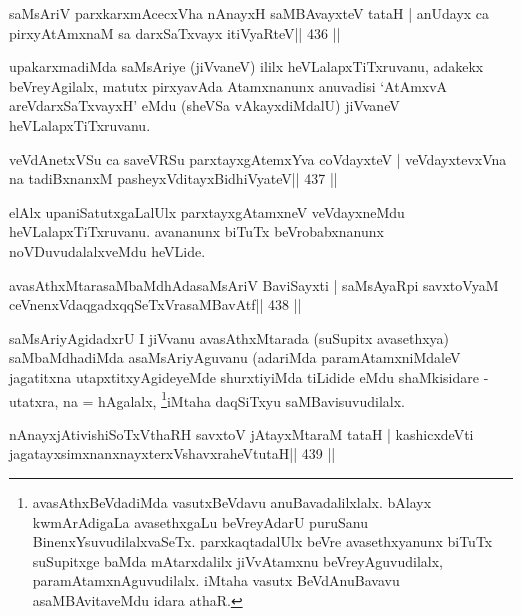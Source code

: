 \begin{shl}
saMsAriV parxkarxmAcecxVha nAnayxH saMBAvayxteV tataH |
anUdayx ca pirxyAtAmxnaM sa darxSaTxvayx itiVyaRteV\hfill || 436 ||
\end{shl}


\begin{artha}
upakarxmadiMda saMsAriye (jiVvaneV) ililx heVLalapxTiTxruvanu, adakekx
beVreyAgilalx, matutx pirxyavAda Atamxnanunx anuvadisi `AtAmxvA
areVdarxSaTxvayxH' eMdu (sheVSa vAkayxdiMdalU) jiVvaneV
heVLalapxTiTxruvanu.
\end{artha}


\begin{shl}
veVdAnetxVSu ca saveVRSu parxtayxgAtemxYva coVdayxteV |
veVdayxtevxVna na tadiBxnanxM pasheyxVditayxBidhiVyateV\hfill || 437 ||
\end{shl}

\begin{artha}
elAlx upaniSatutxgaLalUlx parxtayxgAtamxneV veVdayxneMdu
heVLalapxTiTxruvanu. avananunx biTuTx beVrobabxnanunx
noVDuvudalalxveMdu heVLide.
\end{artha}


\begin{shl}
avasAthxMtarasaMbaMdhAdasaMsAriV BaviSayxti |
saMsAyaRpi savxtoV\s yaM ceVnenxVdaqgadxqqSeTxVrasaMBavAtf\hfill || 438 ||
\end{shl}

\begin{artha}
saMsAriyAgidadxrU I jiVvanu avasAthxMtarada (suSupitx avasethxya)
saMbaMdhadiMda asaMsAriyAguvanu (adariMda paramAtamxniMdaleV
jagatitxna utapxtitxyAgideyeMde shurxtiyiMda tiLidide eMdu
shaMkisidare - utatxra, na = hAgalalx, \footnote{avasAthxBeVdadiMda 
vasutxBeVdavu anuBavadalilxlalx. bAlayx
kwmArAdigaLa avasethxgaLu beVreyAdarU puruSanu
BinenxYsuvudilalxvaSeTx. parxkaqtadalUlx beVre avasethxyanunx biTuTx
suSupitxge baMda mAtarxdalilx jiVvAtamxnu beVreyAguvudilalx,
paramAtamxnAguvudilalx. iMtaha vasutx BeVdAnuBavavu asaMBAvitaveMdu
idara athaR.}iMtaha daqSiTxyu saMBavisuvudilalx.
\end{artha}



\begin{shl}
nAnayxjAtivishiSoTxV\s thaRH savxtoV jAtayxMtaraM tataH |
kashicxdeVti jagatayxsimxnanxnayxterxVshavxraheVtutaH\hfill || 439 ||
\end{shl}


